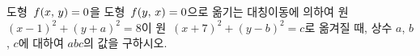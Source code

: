 도형~$f(x,\mkern3mu y)=0$을 도형~$f(y,\mkern3mu x)=0$으로 옮기는 대칭이동에 의하여 원~$(x-1)^2+(y+a)^2=8$이 원~$(x+7)^2+(y-b)^2=c$로 옮겨질 때, 상수 $a$, $b$, $c$에 대하여 $abc$의 값을 구하시오.
